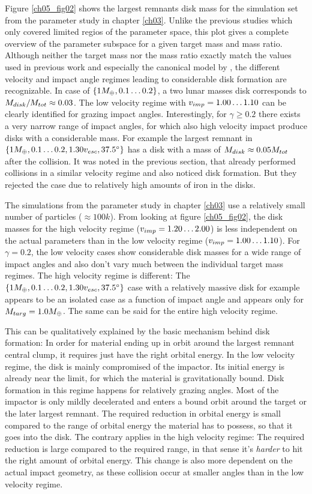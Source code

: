 Figure \ref{ch05_fig02} shows the largest remnants disk mass for the simulation set \css from the parameter study in chapter \ref{ch03}. Unlike the previous studies which only covered limited regios of the parameter space, this plot gives a complete overview of the parameter subspace for a given target mass and mass ratio. Although neither the target mass nor the mass ratio exactly match the values used in previous work and especially the canonical model by \cite{Canup:2001p1861}, the different velocity and impact angle regimes leading to considerable disk formation are recognizable. In case of $\{ 1 M_{\oplus}, 0.1 \dots 0.2 \}$, a two lunar masses disk corresponds to $M_{disk} / M_{tot} \approx 0.03$. The low velocity regime with $v_{imp} = 1.00 \dots 1.10$ can be clearly identified for grazing impact angles. Interestingly, for $\gamma \ge 0.2$ there exists a very narrow range of impact angles, for which also high velocity impact produce disks with a considerable mass. For example the largest remnant in $\{ 1 M_{\oplus}, 0.1 \dots 0.2, 1.30 v_{esc}, 37.5 ^\circ \}$ has a disk with a mass of $M_{disk} \approx 0.05 M_{tot}$ after the collision. It was noted in the previous section, that \cite{Benz:1989p1893} already performed collisions in a similar velocity regime and also noticed disk formation. But they rejected the case due to relatively high amounts of iron in the disks.

The simulations from the parameter study in chapter \ref{ch03} use a relatively small number of particles ($\approx 100k$). From looking at figure \ref{ch05_fig02}, the disk masses for the high velocity regime ($v_{imp} = 1.20 \dots 2.00$) is less independent on the actual parameters than in the low velocity regime ($v_{imp} = 1.00 \dots 1.10$). For $\gamma = 0.2$, the low velocity cases show considerable disk masses for a wide range of impact angles and also don't vary much between the individual target mass regimes. The high velocity regime is different: The $\{ 1 M_{\oplus}, 0.1 \dots 0.2, 1.30 v_{esc}, 37.5 ^\circ \}$ case with a relatively massive disk for example appears to be an isolated case as a function of impact angle and appears only for $M_{targ} = 1.0 M_{\oplus}$. The same can be said for the entire high velocity regime. 

This can be qualitatively explained by the basic mechanism behind disk formation: In order for material ending up in orbit around the largest remnant central clump, it requires just have the right orbital energy. In the low velocity regime, the disk is mainly compromised of the impactor. Its initial energy is already near the limit, for which the material is gravitationally bound. Disk formation in this regime happens for relatively grazing angles. Most of the impactor is only mildly decelerated and enters a bound orbit around the target or the later largest remnant. The required reduction in orbital energy is small compared to the range of orbital energy the material has to possess, so that it goes into the disk. The contrary applies in the high velocity regime: The required reduction is large compared to the required range, in that sense it's \emph{harder} to hit the right amount of orbital energy. This change is also more dependent on the actual impact geometry, as these collision occur at smaller angles than in the low velocity regime.

